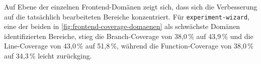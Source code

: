 Auf Ebene der einzelnen Frontend-Domänen zeigt sich, dass sich die Verbesserung auf die tatsächlich bearbeiteten Bereiche konzentriert. Für \texttt{experiment-wizard}, eine der beiden in \autoref{fig:frontend-coverage-domaenen} als schwächste Domänen identifizierten Bereiche, stieg die Branch-Coverage von 38{,}0\,\% auf 43{,}9\,\% und die Line-Coverage von 43{,}0\,\% auf 51{,}8\,\%, während die Function-Coverage von 38{,}0\,\% auf 34{,}3\,\% leicht zurückging.